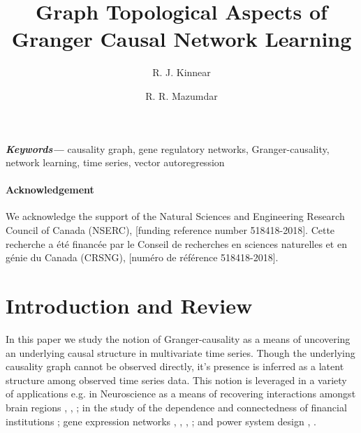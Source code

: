 \documentclass{statsoc}
\title{Graph Topological Aspects of Granger Causal Network Learning}
\author[Author 1 {\it et al.}]{R. J. Kinnear}
\author{R. R. Mazumdar}
\providecommand{\keywords}[1]{\textbf{\textit{Keywords---}} #1}
\begin{document}

\keywords{causality graph, gene regulatory networks,
  Granger-causality, network learning, time series, vector
  autoregression}

\paragraph{Acknowledgement}

We acknowledge the support of the Natural Sciences and Engineering Research Council of Canada (NSERC), [funding reference number 518418-2018].  Cette recherche a été financée par le Conseil de recherches en sciences naturelles et en génie du Canada (CRSNG), [numéro de référence 518418-2018].

\section{Introduction and Review}
\label{sec:introduction}
In this paper we study the notion of Granger-causality
\cite{granger1969investigating} \cite{Granger1980329} as a means of
uncovering an underlying causal structure in multivariate time series.
Though the underlying causality graph cannot be observed directly,
it's presence is inferred as a latent structure among observed
time series data.  This notion is leveraged in a variety of
applications e.g. in Neuroscience as a means of recovering
interactions amongst brain regions \cite{bressler2011wiener},
\cite{anna_paper2008}, \cite{david2008identifying}; in the study of
the dependence and connectedness of financial institutions
\cite{NBERw16223}; gene expression networks \cite{Fujita2007},
\cite{methods_for_inferring_gene_regulatory_networks_from_time_series_expression_data},
\cite{grouped_graphical_granger_modelling_for_gene_expression_regulatory_networks_discovery},
\cite{discovering_graphical_Granger_causality_using_the_truncating_lasso_penalty};
and power system design \cite{Misyrlis2016450}, \cite{yuan2014root}.
\end{document}
